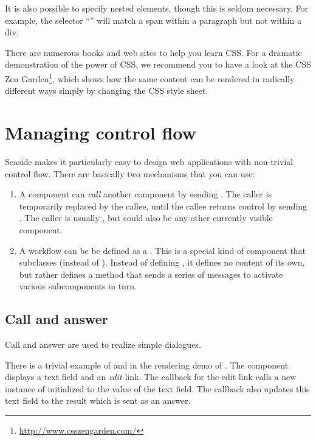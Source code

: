 \documentclass[a4paper,10pt,twoside]{book}
\begin{document}
It is also possible to specify nested elements, though this is seldom necessary.
For example, the selector ``'' will match a span within a paragraph but not
within a div.

There are numerous books and web sites to help you learn CSS.
For a dramatic demonstration of the power of CSS, we recommend you to have a look at the
CSS Zen Garden\footnote{\url{http://www.csszengarden.com/}}, which shows how the same
content can be rendered in radically different ways simply by changing the CSS style
sheet.

\section{Managing control flow}

Seaside makes it particularly easy to design web applications with non-trivial control
flow.
There are basically two mechanisms that you can use:

\begin{enumerate}
\item A component can \emph{call} another component by sending .
The caller is temporarily replaced by the callee, until the callee returns
control by
sending .
The caller is usually , but could also be any other currently visible component.  \item A workflow can be be defined as a .
This is a special kind of component that subclasses  (instead of
). 
Instead of defining , it defines no content of its own, but rather
defines a  method that sends a series of  messages to activate various
subcomponents in turn.
\end{enumerate}

\subsection{Call and answer}

Call and answer are used to realize simple dialogues.

There is a trivial example of  and  in the rendering demo of
.
The component  displays a text field and an \emph{edit} link.
The callback for the edit link calls a new instance of 
initialized to the value of the text field.
The callback also updates this text field to the result which is sent as an answer.
\end{document}
